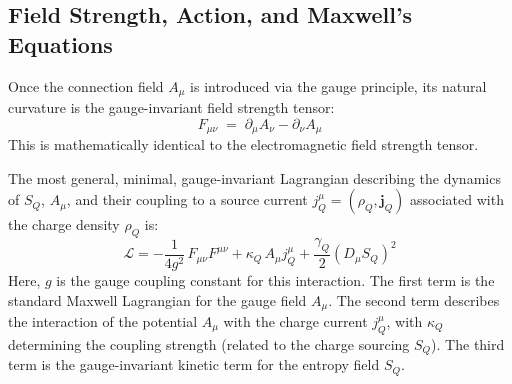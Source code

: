 \documentclass[11pt]{article}
\begin{document}
\subsection{Field Strength, Action, and Maxwell's Equations}

Once the connection field $A_\mu$ is introduced via the gauge principle, its natural curvature is the gauge-invariant field strength tensor:
\begin{equation}
F_{\mu\nu} \;=\; \partial_\mu A_\nu - \partial_\nu A_\mu \label{eq:Fmn_Q_app}
\end{equation}
This is mathematically identical to the electromagnetic field strength tensor.

The most general, minimal, gauge-invariant Lagrangian describing the dynamics of $S_Q$, $A_\mu$, and their coupling to a source current $j^\mu_Q = (\rho_Q, \mathbf{j}_Q)$ associated with the charge density $\rho_Q$ is:
\begin{equation}
\mathcal{L} = -\frac{1}{4g^2}\,F_{\mu\nu}F^{\mu\nu} + \kappa_Q\,A_\mu j^\mu_Q + \frac{\gamma_Q}{2}(D_\mu S_Q)^2 \label{eq:gaugeL_Q_app}
\end{equation}
Here, $g$ is the gauge coupling constant for this interaction. The first term is the standard Maxwell Lagrangian for the gauge field $A_\mu$. The second term describes the interaction of the potential $A_\mu$ with the charge current $j^\mu_Q$, with $\kappa_Q$ determining the coupling strength (related to the charge sourcing $S_Q$). The third term is the gauge-invariant kinetic term for the entropy field $S_Q$.
\end{document}
